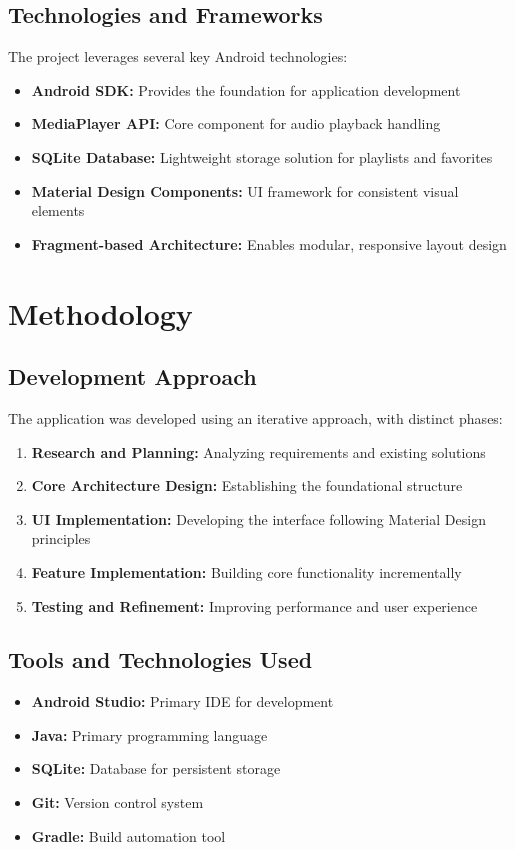 \documentclass{article}
\begin{document}
\subsection{Technologies and Frameworks}
The project leverages several key Android technologies:
\begin{itemize}
    \item \textbf{Android SDK:} Provides the foundation for application development
    \item \textbf{MediaPlayer API:} Core component for audio playback handling
    \item \textbf{SQLite Database:} Lightweight storage solution for playlists and favorites
    \item \textbf{Material Design Components:} UI framework for consistent visual elements
    \item \textbf{Fragment-based Architecture:} Enables modular, responsive layout design
\end{itemize}

\section{Methodology}
\subsection{Development Approach}
The application was developed using an iterative approach, with distinct phases:
\begin{enumerate}
    \item \textbf{Research and Planning:} Analyzing requirements and existing solutions
    \item \textbf{Core Architecture Design:} Establishing the foundational structure
    \item \textbf{UI Implementation:} Developing the interface following Material Design principles
    \item \textbf{Feature Implementation:} Building core functionality incrementally
    \item \textbf{Testing and Refinement:} Improving performance and user experience
\end{enumerate}

\subsection{Tools and Technologies Used}
\begin{itemize}
    \item \textbf{Android Studio:} Primary IDE for development
    \item \textbf{Java:} Primary programming language
    \item \textbf{SQLite:} Database for persistent storage
    \item \textbf{Git:} Version control system
    \item \textbf{Gradle:} Build automation tool
\end{itemize}
\end{document}
